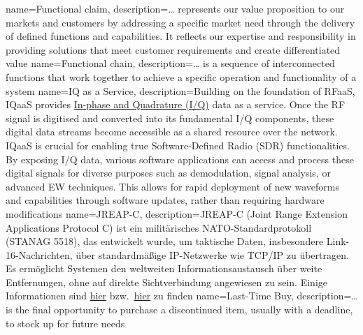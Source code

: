 %
{%
	name=Functional claim,%
	description={\dots{} represents our value proposition to our markets and customers by addressing a specific market need through the delivery of defined functions and capabilities. It reflects our expertise and responsibility in providing solutions that meet customer requirements and create differentiated value}%
}
%
{%
	name=Functional chain,%
	description={\dots{} is a sequence of interconnected functions that work  together to achieve a specific operation and functionality of a system}%
}
%
{%
	name=IQ as a Service,%
	description={Building on the foundation of RFaaS, IQaaS provides \href{https://en.wikipedia.org/wiki/In-phase_and_quadrature_components}{In-phase and Quadrature (I/Q)} data as a service. %
		Once the RF signal is digitised and converted into its fundamental I/Q components, these digital data streams %
		become accessible as a shared resource over the network. %
		IQaaS is crucial for enabling true Software-Defined Radio (SDR) functionalities. %
		By exposing I/Q data, various software applications can access and process these digital signals for diverse %
		purposes such as demodulation, signal analysis, or advanced EW techniques. %
		This allows for rapid deployment of new waveforms and capabilities through software updates, %
		rather than requiring hardware modifications}%
}
%
{%
	name=JREAP-C,%
	description={JREAP-C (Joint Range Extension Applications Protocol C) ist ein militärisches NATO-Standardprotokoll (STANAG 5518), %
		das entwickelt wurde, um taktische Daten, insbesondere Link-16-Nachrichten, über standardmäßige IP-Netzwerke wie TCP/IP zu übertragen. %
		Es ermöglicht Systemen den weltweiten Informationsaustausch über weite Entfernungen, ohne auf direkte Sichtverbindung angewiesen zu sein. %
		Einige Informationen sind \href{https://marineforum.online/link-22-fuer-f124-kurs-marine-2025/}{hier} bzw.\ \href{https://archive.ph/a5Oef}{hier} zu finden}%
}
%
{%
	name=Last-Time Buy,%
	description={\dots{} is the final opportunity to purchase a discontinued item, usually with a deadline, to stock up for future needs}%
}
%
